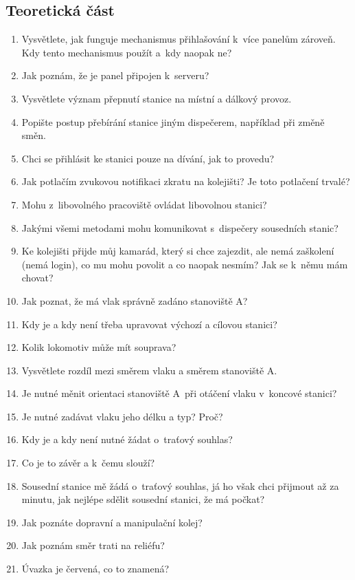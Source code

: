 \documentclass[12pt,a4paper]{article}
\begin{document}
\subsection*{Teoretická část}

\begin{enumerate}[leftmargin=*]
\item Vysvětlete, jak funguje mechanismus přihlašování k~více panelům zároveň.
Kdy tento mechanismus použít a~kdy naopak ne?
\item Jak poznám, že je panel připojen k~serveru?
\item Vysvětlete význam přepnutí stanice na místní a dálkový provoz.
\item Popište postup přebírání stanice jiným dispečerem, například při změně
směn.
\item Chci se přihlásit ke stanici pouze na dívání, jak to provedu?
\item Jak potlačím zvukovou notifikaci zkratu na kolejišti? Je toto potlačení
trvalé?
\item Mohu z~libovolného pracoviště ovládat libovolnou stanici?
\item Jakými všemi metodami mohu komunikovat s~dispečery sousedních stanic?
\item Ke kolejišti přijde můj kamarád, který si chce zajezdit, ale nemá
zaškolení (nemá login), co mu mohu povolit a co naopak nesmím? Jak se k~němu
mám chovat?

\item Jak poznat, že má vlak správně zadáno stanoviště A?
\item Kdy je a kdy není třeba upravovat výchozí a cílovou stanici?
\item Kolik lokomotiv může mít souprava?
\item Vysvětlete rozdíl mezi směrem vlaku a směrem stanoviště A.
\item Je nutné měnit orientaci stanoviště A~při otáčení vlaku v~koncové
stanici?
\item Je nutné zadávat vlaku jeho délku a typ? Proč?

\item Kdy je a kdy není nutné žádat o~traťový souhlas?
\item Co je to závěr a k~čemu slouží?
\item Sousední stanice mě žádá o~traťový souhlas, já ho však chci přijmout až
za minutu, jak nejlépe sdělit sousední stanici, že má počkat?
\item Jak poznáte dopravní a manipulační kolej?
\item Jak poznám směr trati na reliéfu?
\item Úvazka je červená, co to znamená?


\end{enumerate}
\end{document}
